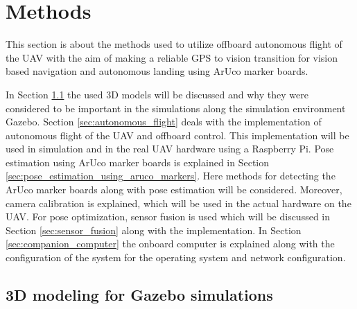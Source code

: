 \documentclass[../Head/report.tex]{subfiles}
\begin{document}


\lstset{style=mystyle}

\section{Methods}
\label{sec:methods}

This section is about the methods used to utilize offboard autonomous flight of the UAV with the aim of making a reliable GPS to vision transition for vision based navigation and autonomous landing using ArUco marker boards.  

In Section \ref{sec:3d_modeling_for_gazebo_simulations} the used 3D models will be discussed and why they were considered to be important in the simulations along the simulation environment Gazebo. Section \ref{sec:autonomous_flight} deals with the implementation of autonomous flight of the UAV and offboard control. This implementation will be used in simulation and in the real UAV hardware using a Raspberry Pi. Pose estimation using ArUco marker boards is explained in Section \ref{sec:pose_estimation_using_aruco_markers}. Here methods for detecting the ArUco marker boards along with pose estimation will be considered. Moreover, camera calibration is explained, which will be used in the actual hardware on the UAV. For pose optimization, sensor fusion is used which will be discussed in Section \ref{sec:sensor_fusion} along with the implementation. In Section \ref{sec:companion_computer} the onboard computer is explained along with the configuration of the system for the operating system and network configuration. 

\subsection{3D modeling for Gazebo simulations}
\label{sec:3d_modeling_for_gazebo_simulations}
\end{document}
